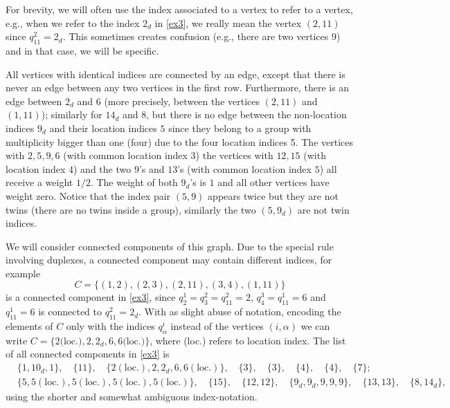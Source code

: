 \documentclass[draft]{article}
\newcommand{\al}{\alpha}
\newcommand{\be}{\begin{equation}}
\newcommand{\ee}{\end{equation}}
\numberwithin{equation}{section}
\numberwithin{theorem}{section}
\numberwithin{definition}{section}
\numberwithin{remark}{section}
\begin{document}
For brevity,
we will often use the index associated to  a vertex to refer to a vertex,
e.g., when we refer to the index $2_d$ in \eqref{ex3}, we really mean
the
vertex $(2, 11)$ since $q_{11}^2= 2_d$. This sometimes
 creates confusion (e.g., there are two vertices  $9$)
 and in that case, we will be specific. 

All vertices  with identical  indices are connected by an edge,
except that there is never an edge between
any two vertices in the first row.
Furthermore, there is an edge  between 
$2_d$ and $6$ (more precisely, between the vertices $(2, 11)$
and $(1,11)$); similarly for $14_d$ and $8$, but
there is no  edge between the  non-location indices $9_d$ 
and their location indices
 $5$ since they belong to a group with multiplicity bigger than one (four)
due to the four location indices 5.
 The vertices with $2,5, 9, 6$ (with common location index $3$)
the vertices with $12, 15$ (with location index $4$) 
and the two $9$'s and $13$'s 
(with common location index $5$) all receive a weight 
$1/2$. The weight of both $9_d$'s is $1$ and all other vertices
have weight zero.
 Notice that the index pair $(5, 9)$ appears twice but they are not twins
(there are no twins inside a group), similarly the two $(5, 9_d)$
are not twin indices.

We will consider connected components of this graph. Due to
the special rule involving duplexes, a connected component may contain
different indices, for example
\be
C= \{ (1,2), (2,3), (2,11),  (3,4), (1,11)  \}
\label{Cex}
\ee
is a connected component in \eqref{ex3},
since $q_2^1= q_3^2=q_{11}^2=2$, $q_4^3=q_{11}^1=6$ and
$q_{11}^1=6$ is connected
to $q_{11}^2=2_d$. With as slight abuse of notation, 
encoding the elements of $C$ only with the indices
$q_\al^i$ instead of the vertices $(i, \al)$ 
we can 
write $C =\{ 2\mbox{(loc.)}, 2, 2_d,  6, 6\mbox{(loc.)}  \} $,
where (loc.) refers to location index.
The list of all  connected components in \eqref{ex3} is
\begin{align}\nonumber
&\{1, 10_d, 1\}, \quad \{11\}, \quad  \{2 (\text{loc.}) ,
 2, 2_d, 6, 6 (\text{loc.})\}, \quad  \{3\}, \quad \{3\}, \quad \{4\},\quad \{4\},\quad \{7\}; \\  
 & \{5, 5 (\text{loc.}), 5 (\text{loc.}), 5 (\text{loc.}), 5 (\text{loc.}) \},\quad 
\{15\},\quad \{12, 12\},\quad  \{9_d, 9_d,9,9,9\},\quad \{13, 13\},\quad \{ 8, 14_d\},
\end{align}
using  the shorter and somewhat ambiguous index-notation.
\end{document}
